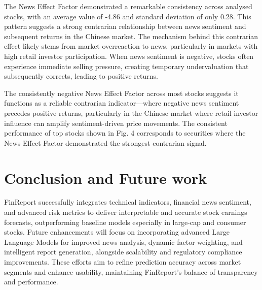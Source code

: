 \documentclass[3p,times,procedia]{elsarticle}
\begin{document}
\begin{table}[!ht]
\centering
\caption{\textbf{Factor Influence Analysis}}
\renewcommand{\arraystretch}{1.3} %
\end{table}





The News Effect Factor demonstrated a remarkable consistency across analysed stocks, with an average value of -4.86 and standard deviation of only 0.28. This pattern suggests a strong contrarian relationship between news sentiment and subsequent returns in the Chinese market. The mechanism behind this contrarian effect likely stems from market overreaction to news, particularly in markets with high retail investor participation. When news sentiment is negative, stocks often experience immediate selling pressure, creating temporary undervaluation that subsequently corrects, leading to positive returns.

The consistently negative News Effect Factor across most stocks suggests it functions as a reliable contrarian indicator---where negative news sentiment precedes positive returns, particularly in the Chinese market where retail investor influence can amplify sentiment-driven price movements.
The consistent performance of top stocks shown in Fig. 4 corresponds to securities where the News Effect Factor demonstrated the strongest contrarian signal.

\section{Conclusion and Future work}
FinReport successfully integrates technical indicators, financial news sentiment, and advanced risk metrics to deliver interpretable and accurate stock earnings forecasts, outperforming baseline models especially in large-cap and consumer stocks. Future enhancements will focus on incorporating advanced Large Language Models for improved news analysis, dynamic factor weighting, and intelligent report generation, alongside scalability and regulatory compliance improvements. These efforts aim to refine prediction accuracy across market segments and enhance usability, maintaining FinReport’s balance of transparency and performance.
\end{document}
